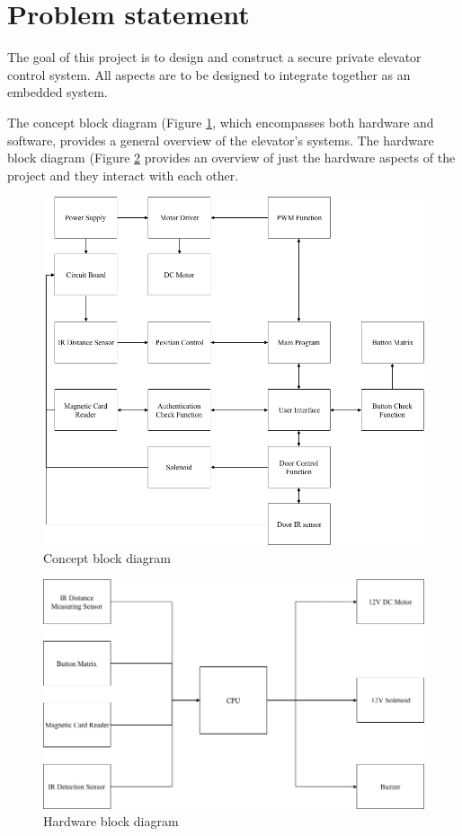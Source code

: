 \documentclass{article}
\begin{document}
	\section{Problem statement}
	The goal of this project is to design and construct a secure private elevator control system. All aspects are to be designed to integrate together as an embedded system. 
	
	The concept block diagram (Figure \ref{fig:concept_block_diagram}, which encompasses both hardware and software, provides a general overview of the elevator's systems. The hardware block diagram (Figure \ref{fig:hardware_block_diagram} provides an overview of just the hardware aspects of the project and they interact with each other.
	
	\begin{figure}[h!]
		\includegraphics[width=\linewidth]{cbd.png}
		\caption{Concept block diagram}
		\label{fig:concept_block_diagram}
	\end{figure}
	
	\begin{figure}[h!]
		\includegraphics[width=\linewidth]{hwbd.png}
		\caption{Hardware block diagram}
		\label{fig:hardware_block_diagram}
	\end{figure}
\end{document}
